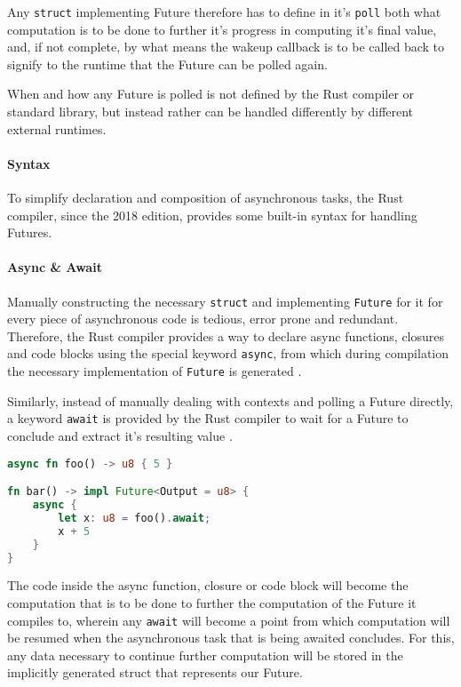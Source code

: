 \documentclass[a4paper,UKenglish,cleveref, autoref, thm-restate]{lipics-v2021}
\begin{document}
Any \lstinline{struct} implementing Future therefore has to define in it's \lstinline{poll} both what computation is to be done to further it's progress in computing it's final value, and, if not complete, by what means the wakeup callback is to be called back to signify to the runtime that the Future can be polled again.

When and how any Future is polled is not defined by the Rust compiler or standard library, but instead rather can be handled differently by different external runtimes.

\paragraph*{Syntax}

To simplify declaration and composition of asynchronous tasks, the Rust compiler, since the 2018 edition, provides some built-in syntax for handling Futures.

\paragraph*{Async \& Await}

Manually constructing the necessary \lstinline{struct} and implementing \lstinline{Future} for it for every piece of asynchronous code is tedious, error prone and redundant. Therefore, the Rust compiler provides a way to declare async functions, closures and code blocks using the special keyword \lstinline{async}, from which during compilation the necessary implementation of \lstinline{Future} is generated \cite{asyncRus3:online}.

Similarly, instead of manually dealing with contexts and polling a Future directly, a keyword \lstinline{await} is provided by the Rust compiler to wait for a Future to conclude and extract it's resulting value \cite{Awaitexp35:online}.

\begin{minipage}{\linewidth}
\begin{lstlisting}[language=Rust,caption={Example for async \& await},captionpos=t]
async fn foo() -> u8 { 5 }

fn bar() -> impl Future<Output = u8> {
    async {
        let x: u8 = foo().await;
        x + 5
    }
}
\end{lstlisting}
\end{minipage}

The code inside the async function, closure or code block will become the computation that is to be done to further the computation of the Future it compiles to, wherein any \lstinline{await} will become a point from which computation will be resumed when the asynchronous task that is being awaited concludes. For this, any data necessary to continue further computation will be stored in the implicitly generated struct that represents our Future.
\end{document}
